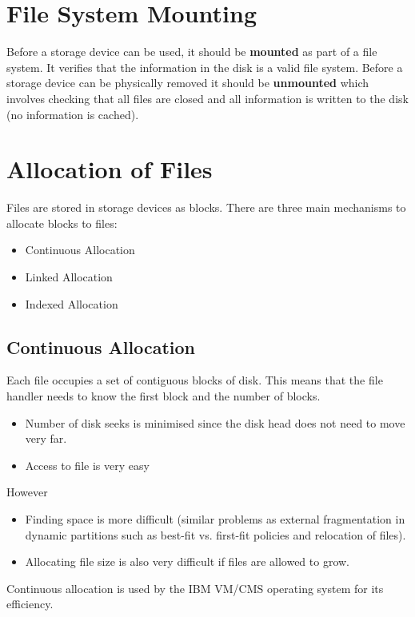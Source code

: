 \documentclass[11pt]{article}
\begin{document}
\section{File System Mounting}
\label{sec:orgff48395}
Before a storage device can be used, it should be \textbf{mounted} as part of a file system.
It verifies that the information in the disk is a valid file system.
Before a storage device can be physically removed it should be \textbf{unmounted} which involves checking that all files are closed and all information is written to the disk (no information is cached).

\section{Allocation of Files}
\label{sec:org258f65d}
Files are stored in storage devices as blocks.
There are three main mechanisms to allocate blocks to files:
\begin{itemize}
\item Continuous Allocation
\item Linked Allocation
\item Indexed Allocation
\end{itemize}

\subsection{Continuous Allocation}
\label{sec:orge427d76}
Each file occupies a set of contiguous blocks of disk.
This means that the file handler needs to know the first block and the number of blocks.
\begin{itemize}
\item Number of disk seeks is minimised since the disk head does not need to move very far.
\item Access to file is very easy
\end{itemize}
However
\begin{itemize}
\item Finding space is more difficult (similar problems as external fragmentation in dynamic partitions such as best-fit vs. first-fit policies and relocation of files).
\item Allocating file size is also very difficult if files are allowed to grow.
\end{itemize}
Continuous allocation is used by the IBM VM/CMS operating system for its efficiency.
\end{document}

